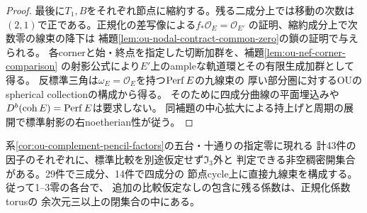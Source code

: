 \begin{proof}
最後に$T_1,B$をそれぞれ節点に縮約する。残る二成分上では移動の次数は
$(2,1)$で正である。正規化の差写像による$f_*\mathcal O_E=\mathcal O_{E'}$
の証明、縮約成分上で次数零の線束の降下は
補題\ref{lem:ou-nodal-contract-common-zero}の鎖の証明で与えられる。
各cornerと始・終点を指定した切断加群を、補題\ref{lem:ou-nef-corner-comparison}
の射影公式により$E'$上のampleな軌道環とその有限生成加群として得る。
反標準三角は$\omega_E=\mathcal O_E$を持つ$\operatorname{Perf} E$の九線束の
厚い部分圏に対するOUのspherical collectionの構成から得る。
そのために四成分曲線の平面埋込みや$D^b(\operatorname{coh} E)=\operatorname{Perf} E$は要求しない。
同補題の中心拡大による持上げと周期の展開で標準射影の右noetherian性が従う。
\end{proof}

\begin{theorem}[補集合二項式内の全残余因子の一般点]
\label{thm:ou-complement-expanded-cycles}
系\ref{cor:ou-complement-pencil-factors}の五台・十通りの指定零に現れる
計43件の因子のそれぞれに、標準比較を別途仮定せず$\mathfrak I_3$外と
判定できる非空稠密開集合がある。29件で三成分、14件で四成分の
節点cycle上に直接九線束を構成する。従って1--3零の各台で、
追加の比較仮定なしの包含に残る係数は、正規化係数torusの
余次元三以上の閉集合の中にある。
\end{theorem}
